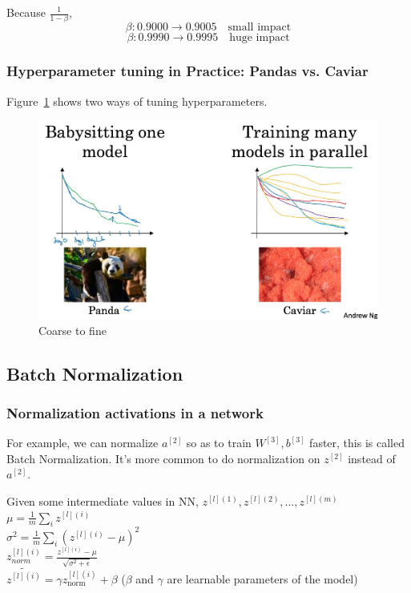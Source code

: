 \documentclass[UTF8]{article}
\newcommand{\Vector}[1]{\boldsymbol{\mathit{#1}}}   %
\newcommand{\Matrix}[1]{\boldsymbol{\mathit{#1}}}   %
\begin{document}
Because $\frac{1}{1-\beta}$,
$$ \beta: 0.9000 \rightarrow 0.9005 \quad \text{small impact} $$
$$ \beta: 0.9990 \rightarrow 0.9995 \quad \text{huge impact} $$

\subsubsection{Hyperparameter tuning in Practice: Pandas vs. Caviar}
Figure~\ref{fig:pandas-vs-caviar} shows two ways of tuning hyperparameters.

\begin{figure}[htb]
    \centering
    \includegraphics[width=40em]{figures/pandas-vs-caviar}
    \caption{Coarse to fine}
    \label{fig:pandas-vs-caviar}
\end{figure}

\subsection{Batch Normalization}
\subsubsection{Normalization activations in a network}
For example, we can normalize $\Vector{a^{[2]}}$ so as to train $\Matrix{W^{[3]}},
\Vector{b^{[3]}}$ faster, this is called Batch Normalization.
It's more common to do normalization on $\Vector{z^{[2]}}$ instead of $\Vector{a^{[2]}}$.

\begin{algorithm}[htb]
    Given some intermediate values in NN, $\Vector{z^{[l](1)}}, \Vector{z^{[l](2)}}, \ldots,
    \Vector{z^{[l](m)}}$ \\
    $\displaystyle \mu = \frac{1}{m} \sum_{i} \Vector{z^{[l](i)}}$ \\
    $\displaystyle \sigma^2 = \frac{1}{m} \sum_i (\Vector{z^{[l](i)}} - \mu)^2$ \\
    $\displaystyle \Vector{z_{\text{norm}}^{[l](i)}} = \frac{\Vector{z^{[l](i)}}-\mu}
    {\sqrt{\sigma^2 + \epsilon}}$ \\
    $\displaystyle \widetilde{z^{[l](i)}} = \gamma z_{\text{norm}}^{[l](i)} + \beta$ \qquad
    ($\beta$ and $\gamma$ are learnable parameters of the model)
\end{algorithm}
\end{document}
